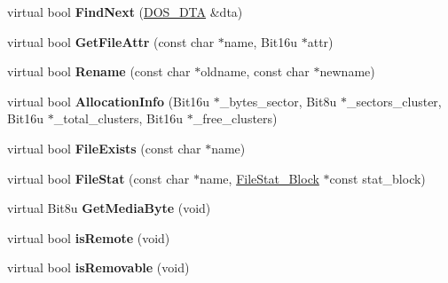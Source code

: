 \begin{DoxyCompactItemize}
\item 
\hypertarget{classphysfsDrive_a0905316e3250c100ac855db7fb793cca}{virtual bool {\bfseries Find\-Next} (\hyperlink{classDOS__DTA}{D\-O\-S\-\_\-\-D\-T\-A} \&dta)}\label{classphysfsDrive_a0905316e3250c100ac855db7fb793cca}

\item 
\hypertarget{classphysfsDrive_a512707a320b5735596ec3e8db67285b9}{virtual bool {\bfseries Get\-File\-Attr} (const char $\ast$name, Bit16u $\ast$attr)}\label{classphysfsDrive_a512707a320b5735596ec3e8db67285b9}

\item 
\hypertarget{classphysfsDrive_a588618aa32343f761ecc8bc8cabc0f90}{virtual bool {\bfseries Rename} (const char $\ast$oldname, const char $\ast$newname)}\label{classphysfsDrive_a588618aa32343f761ecc8bc8cabc0f90}

\item 
\hypertarget{classphysfsDrive_a4095121f44607260117dabc726785d78}{virtual bool {\bfseries Allocation\-Info} (Bit16u $\ast$\-\_\-bytes\-\_\-sector, Bit8u $\ast$\-\_\-sectors\-\_\-cluster, Bit16u $\ast$\-\_\-total\-\_\-clusters, Bit16u $\ast$\-\_\-free\-\_\-clusters)}\label{classphysfsDrive_a4095121f44607260117dabc726785d78}

\item 
\hypertarget{classphysfsDrive_a6334291bdcf9f86331aaf9bef3cad028}{virtual bool {\bfseries File\-Exists} (const char $\ast$name)}\label{classphysfsDrive_a6334291bdcf9f86331aaf9bef3cad028}

\item 
\hypertarget{classphysfsDrive_a6009c900fedfb1b6e57d1c315079e8c8}{virtual bool {\bfseries File\-Stat} (const char $\ast$name, \hyperlink{structFileStat__Block}{File\-Stat\-\_\-\-Block} $\ast$const stat\-\_\-block)}\label{classphysfsDrive_a6009c900fedfb1b6e57d1c315079e8c8}

\item 
\hypertarget{classphysfsDrive_afd28d9e4cbf83ae961c729f6898be8dc}{virtual Bit8u {\bfseries Get\-Media\-Byte} (void)}\label{classphysfsDrive_afd28d9e4cbf83ae961c729f6898be8dc}

\item 
\hypertarget{classphysfsDrive_a34ede4147c785008ce45962ed66a4816}{virtual bool {\bfseries is\-Remote} (void)}\label{classphysfsDrive_a34ede4147c785008ce45962ed66a4816}

\item 
\hypertarget{classphysfsDrive_ab58f923d17fbef915a0ee27b092b542d}{virtual bool {\bfseries is\-Removable} (void)}\label{classphysfsDrive_ab58f923d17fbef915a0ee27b092b542d}


\end{DoxyCompactItemize}
